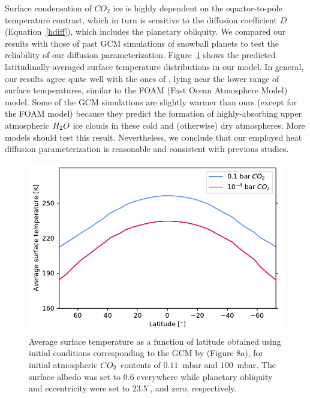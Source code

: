 \documentclass[fleqn,usenatbib]{mnras}
\begin{document}
Surface condensation of $CO_{\mathrm{2}}$ ice is highly dependent on the equator-to-pole temperature contrast, which in turn is sensitive to the diffusion coefficient $D$ (Equation~\ref{hdiff}), which includes the planetary obliquity. We compared our results with those of past GCM simulations of snowball planets \citep{hoffman_snowball_2017} to test the reliability of our diffusion parameterization. Figure~\ref{fig:Hoffman_comparison} shows the predicted latitudinally-averaged surface temperature distributions in our model. In general, our results agree quite well with the ones of \citet{hoffman_snowball_2017}, lying near the lower range of surface temperatures, similar to the FOAM (Fast Ocean Atmosphere Model) model. Some of the GCM simulations are slightly warmer than ours (except for the FOAM model) because they predict the formation of highly-absorbing upper atmospheric $H_{\rm 2}O$ ice clouds in these cold and (otherwise) dry atmospheres. More models should test this result. Nevertheless, we conclude that our employed heat diffusion parameterization is reasonable and consistent with previous studies.

\begin{figure}
	\includegraphics[width=\columnwidth]{Figures/Hoffman_comparison.pdf}
    \caption{Average surface temperature as a function of latitude obtained using initial conditions corresponding to the GCM by \citet{hoffman_snowball_2017} (Figure 8a), for initial atmospheric $CO_{\rm 2}$ contents of $0.11$~mbar and $100$~mbar. The surface albedo was set to $0.6$ everywhere while planetary obliquity and eccentricity were set to $23.5^{\circ}$, and zero, respectively.}
    \label{fig:Hoffman_comparison}
\end{figure}
\end{document}
